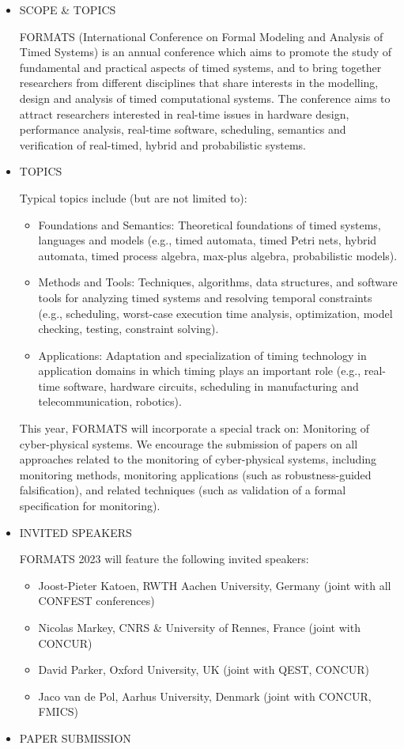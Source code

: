 \documentclass[prodmode,acmtecs]{acmsmall} %
\begin{document}
\begin{itemize}\item  SCOPE \& TOPICS 
 
  FORMATS (International Conference on Formal Modeling and Analysis of Timed Systems) is an annual conference which aims to promote the study of fundamental and practical aspects of timed systems, and to bring together researchers from different disciplines that share interests in the modelling, design and analysis of timed computational systems. The conference aims to attract researchers interested in real-time issues in hardware design, performance analysis, real-time software, scheduling, semantics and verification of real-timed, hybrid and probabilistic systems. 
 
\item  TOPICS  
 
  Typical topics include (but are not limited to): 
 
\begin{itemize}\item  Foundations and Semantics: Theoretical foundations of timed systems, languages and models (e.g., timed automata, timed Petri nets, hybrid automata, timed process algebra, max-plus algebra, probabilistic models).
\item  Methods and Tools: Techniques, algorithms, data structures, and software tools for analyzing timed systems and resolving temporal constraints (e.g., scheduling, worst-case execution time analysis, optimization, model checking, testing, constraint solving).
\item  Applications: Adaptation and specialization of timing technology in application domains in which timing plays an important role (e.g., real-time software, hardware circuits, scheduling in manufacturing and telecommunication, robotics).
\end{itemize} 
  This year, FORMATS will incorporate a special track on: Monitoring of cyber-physical systems. We encourage the submission of papers on all approaches related to the monitoring of cyber-physical systems, including monitoring methods, monitoring applications (such as robustness-guided falsification), and related techniques (such as validation of a formal specification for monitoring). 
 
\item  INVITED SPEAKERS 
 
  FORMATS 2023 will feature the following invited speakers: 
 
\begin{itemize}\item  Joost-Pieter Katoen, RWTH Aachen University, Germany (joint with all CONFEST conferences) 
\item  Nicolas Markey, CNRS \& University of Rennes, France (joint with CONCUR) 
\item  David Parker, Oxford University, UK (joint with QEST, CONCUR) 
\item  Jaco van de Pol, Aarhus University, Denmark (joint with CONCUR, FMICS)
\end{itemize} 
\item  PAPER SUBMISSION 
 

\end{itemize}
\end{document}
